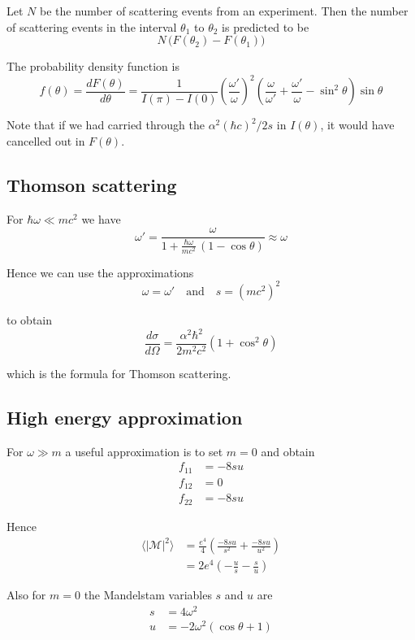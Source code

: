 \documentclass[12pt]{article}
\begin{document}
Let $N$ be the number of scattering events from an experiment.
Then the number of scattering events in the interval $\theta_1$
to $\theta_2$ is predicted to be
$$
N\,\bigl(F(\theta_2)-F(\theta_1)\bigr)
$$

The probability density function is
$$
f(\theta)=\frac{dF(\theta)}{d\theta}
=\frac{1}{I(\pi)-I(0)}
\left(\frac{\omega'}{\omega}\right)^2
\left(\frac{\omega}{\omega'}+\frac{\omega'}{\omega}-\sin^2\theta\right)
\sin\theta
$$

Note that if we had carried through the $\alpha^2(\hbar c)^2/2s$ in $I(\theta)$,
it would have cancelled out in $F(\theta)$.

\subsection*{Thomson scattering}
For $\hbar\omega\ll mc^2$ we have
\begin{equation*}
\omega'=\frac{\omega}{1+\frac{\hbar\omega}{mc^2}\,(1-\cos\theta)}\approx\omega
\end{equation*}

Hence we can use the approximations
\begin{equation*}
\omega=\omega'\quad\text{and}\quad s=(mc^2)^2
\end{equation*}

to obtain
\begin{equation*}
\frac{d\sigma}{d\Omega}=\frac{\alpha^2\hbar^2}{2m^2c^2}\left(1+\cos^2\theta\right)
\end{equation*}

which is the formula for Thomson scattering.

\subsection*{High energy approximation}
For $\omega\gg m$ a useful approximation is to set $m=0$ and obtain
\begin{align*}
f_{11}&=-8su
\\
f_{12}&=0
\\
f_{22}&=-8su
\end{align*}

Hence
\begin{align*}
\langle|\mathcal{M}|^2\rangle
&=\frac{e^4}{4}
\left(\frac{-8su}{s^2}+\frac{-8su}{u^2}\right)
\\
&=2e^4
\left(-\frac{u}{s}-\frac{s}{u}\right)
\end{align*}

Also for $m=0$ the Mandelstam variables $s$ and $u$ are
\begin{align*}
s&=4\omega^2
\\
u&=-2\omega^2(\cos\theta+1)
\end{align*}
\end{document}
